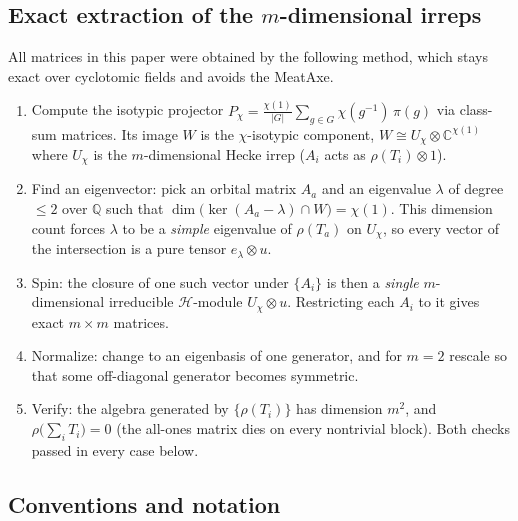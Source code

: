 \documentclass[11pt]{article}
\theoremstyle{remark}
\newcommand{\C}{\mathbb{C}}
\newcommand{\Q}{\mathbb{Q}}
\newcommand{\T}[1]{T_{#1}}
\begin{document}
\subsection{Exact extraction of the $m$-dimensional irreps}

All matrices in this paper were obtained by the following method, which
stays exact over cyclotomic fields and avoids the MeatAxe.

\begin{enumerate}
\item Compute the isotypic projector
  $P_\chi = \frac{\chi(1)}{|G|}\sum_{g\in G}\chi(g^{-1})\,\pi(g)$
  via class-sum matrices. Its image $W$ is the $\chi$-isotypic component,
  $W \cong U_\chi \otimes \C^{\chi(1)}$ where $U_\chi$ is the
  $m$-dimensional Hecke irrep ($A_i$ acts as $\rho(\T i)\otimes 1$).
\item Find an eigenvector: pick an orbital matrix $A_a$ and an eigenvalue
  $\lambda$ of degree $\le 2$ over $\Q$ such that
  $\dim\bigl(\ker(A_a-\lambda)\cap W\bigr) = \chi(1)$. This dimension count
  forces $\lambda$ to be a \emph{simple} eigenvalue of $\rho(\T a)$ on
  $U_\chi$, so every vector of the intersection is a pure tensor
  $e_\lambda\otimes u$.
\item Spin: the closure of one such vector under $\{A_i\}$ is then a
  \emph{single} $m$-dimensional irreducible $\mathcal H$-module
  $U_\chi\otimes u$. Restricting each $A_i$ to it gives exact
  $m\times m$ matrices.
\item Normalize: change to an eigenbasis of one generator, and for $m=2$
  rescale so that some off-diagonal generator becomes symmetric.
\item Verify: the algebra generated by $\{\rho(\T i)\}$ has dimension
  $m^2$, and $\rho\bigl(\sum_i \T i\bigr)=0$ (the all-ones matrix dies on
  every nontrivial block). Both checks passed in every case below.
\end{enumerate}

\subsection{Conventions and notation}
\end{document}
